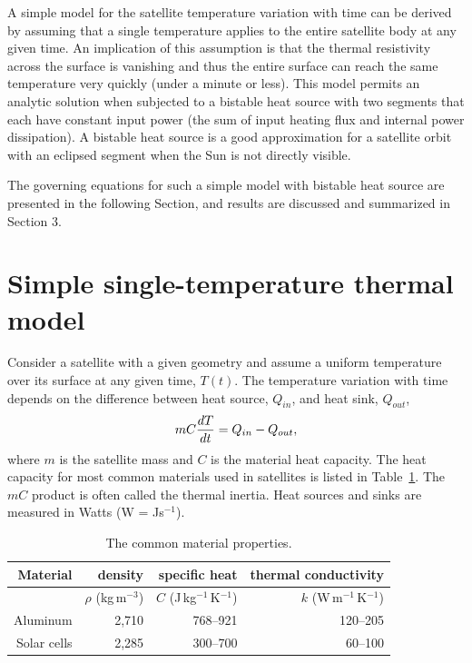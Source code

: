 \documentclass[]{aastex62}
\def\eq#1{\begin{equation} #1 \end{equation}}
\begin{document}
A simple model for the satellite temperature variation with time can be derived by assuming that a single
temperature applies to the entire satellite body at any  given time. An implication of this assumption is 
that the thermal resistivity across the surface is vanishing and thus the entire surface can reach the
same temperature very quickly (under a minute or less). This model permits an analytic solution 
when subjected to a bistable heat source with two segments that each have constant input power 
(the sum of input heating flux and internal power dissipation). A bistable heat source is a good 
approximation for a satellite orbit with an eclipsed segment when the Sun is not directly visible. 

The governing equations for such a simple model with bistable heat source are presented in the 
following Section, and results are discussed and summarized in Section 3. 
  

\section{Simple single-temperature thermal model} 

Consider a satellite with a given geometry and assume a uniform temperature over its surface
at any given time, $T(t)$. The temperature variation with time depends on the difference between
heat source, $Q_{in}$, and heat sink, $Q_{out}$, 
\eq{
\label{eq:dTdt}
                 m C {dT \over dt} =  Q_{in} - Q_{out}, 
}
where $m$ is the satellite mass and $C$ is the material heat capacity. The heat capacity for 
most common materials used in satellites is listed in Table~\ref{tab:inputsMatProp}. 
The $mC$ product is often called the thermal inertia. Heat sources and sinks are measured in 
Watts (W = Js$^{-1}$). 

\begin{table}[ht!]
	\centering
	\caption{The common material properties. }
	\label{tab:inputsMatProp}
	\begin{tabular}{r|r|r|r} %
		\hline
  	        Material    &      density &   specific heat & thermal conductivity \\
		\hline
                 \phantom{x}              & $\rho$ (kg\,m$^{-3}$)   &   $C$ (J\,kg$^{-1}$\,K$^{-1}$)  & $k$ (W\,m$^{-1}$\,K$^{-1}$)  \\
             Aluminum  &       2,710       &         768--921      &     120--205  \\ 
             Solar cells  &       2,285       &         300--700      &     60--100    \\
 		\hline
	\end{tabular} 
\end{table}
 
\end{document}
